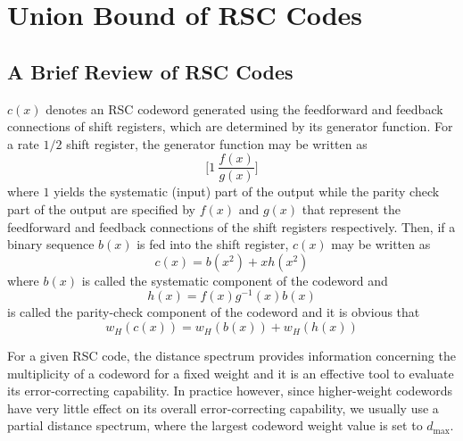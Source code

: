 \section{Union Bound of RSC Codes}
\label{sec2}
\subsection{A Brief Review of RSC Codes}
$c(x)$ denotes an RSC codeword generated using the feedforward and feedback connections of shift registers, which are determined by its generator function. For a rate $1/2$ shift register, the generator function may be written as  $$\Big[1 ~\frac{f(x)}{g(x)}\Big]$$ where $1$ yields the systematic (input) part  of the output while the parity check part of the output are specified by  $f(x)$ and $g(x)$ that represent the feedforward and feedback connections of the shift registers respectively. Then, if a binary sequence $b(x)$ is fed into the shift register, $c(x)$ may be written as 
\begin{equation}
c(x) = b(x^2)+xh(x^2)
\label{codeword-comp}
\end{equation}
where $b(x)$ is called the systematic component of the codeword and
\begin{equation}
h(x) =f(x)g^{-1}(x)b(x)
\label{eq:parity-def}
\end{equation}
 is called the parity-check component of the codeword and it is obvious that 
\begin{equation}
w_H(c(x))=w_H(b(x)) + w_H(h(x))
\label{eq:cw-weight}
\end{equation}

For a given RSC code, the distance spectrum provides information concerning the multiplicity of a codeword for a fixed weight and it is an effective tool to evaluate its error-correcting capability. In practice however, since higher-weight codewords have very little effect on its overall error-correcting capability, we usually use a partial distance spectrum, where the largest codeword weight value is set to $d_{\text{max}}$. 

